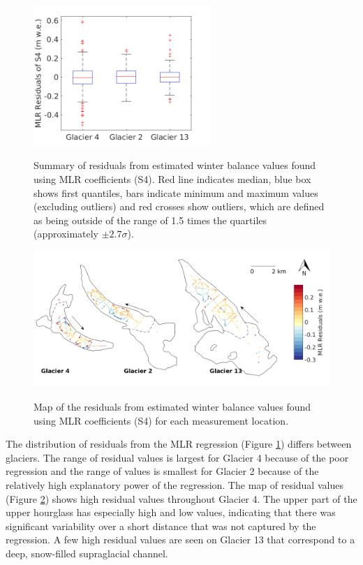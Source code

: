 \documentclass{sfuthesis}
\newcommand{\boxMatlab}{Red line indicates median, blue box shows first quantiles, bars indicate minimum and maximum values (excluding outliers) and red crosses show outliers, which are defined as being outside of the range of 1.5 times the quartiles (approximately $\pm2.7\sigma$). }
\begin{document}
\begin{figure}[H]
\centering
	\includegraphics[width =0.6\textwidth]{residuals_box_MLR.png}\\
\caption[Summary of residuals from estimated winter balance values found using MLR coefficients (S4)]{Summary of residuals from estimated winter balance values found using MLR coefficients (S4). \boxMatlab}
\label{fig:MLRresidualsboxplot}
\end{figure} 

\begin{figure}[H]
	\centering
	\includegraphics[width =\textwidth]{residualsMap_MLR.png}\\
	\caption{Map of the residuals from estimated winter balance values found using MLR coefficients (S4) for each measurement location.}
	\label{fig:MLR_residualsMap}
\end{figure} 


The distribution of residuals from the MLR regression (Figure \ref{fig:MLRresidualsboxplot}) differs between glaciers. The range of residual values is largest for Glacier 4 because of the poor regression and the range of values is smallest for Glacier 2 because of the relatively high explanatory power of the regression. The map of residual values (Figure \ref{fig:MLR_residualsMap}) shows high residual values throughout Glacier 4. The upper part of the upper hourglass has especially high and low values, indicating that there was significant variability over a short distance that was not captured by the regression. A few high residual values are seen on Glacier 13 that correspond to a deep, snow-filled supraglacial channel.
\end{document}
